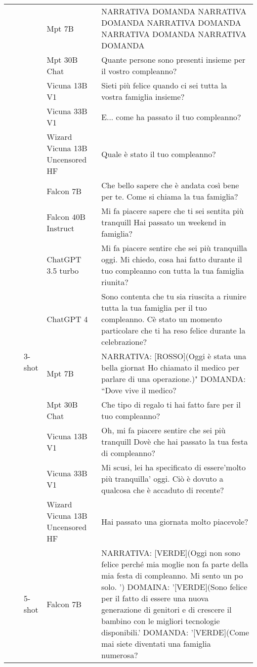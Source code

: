 \begin{center}
\begin{longtable}{l|l|l|p{3cm}|p{8cm}}
 &  &  & Mpt 7B & NARRATIVA DOMANDA NARRATIVA DOMANDA NARRATIVA DOMANDA NARRATIVA DOMANDA NARRATIVA DOMANDA \\
 &  &  & Mpt 30B Chat & Quante persone sono presenti insieme per il vostro compleanno? \\
 &  &  & Vicuna 13B V1 & Sieti più felice quando ci sei tutta la vostra famiglia insieme? \\
 &  &  & Vicuna 33B V1 & E... come ha passato il tuo compleanno? \\
 &  &  & Wizard Vicuna 13B Uncensored HF &  Quale è stato il tuo compleanno? \\
\cline{3-5}
 &  & \multirow[c]{9}{*}{3-shot} & Falcon 7B & Che bello sapere che è andata così bene per te. Come si chiama la tua famiglia? \\
 &  &  & Falcon 40B Instruct & Mi fa piacere sapere che ti sei sentita più tranquill Hai passato un weekend in famiglia? \\
 &  &  & ChatGPT 3.5 turbo & Mi fa piacere sentire che sei più tranquilla oggi. Mi chiedo, cosa hai fatto durante il tuo compleanno con tutta la tua famiglia riunita? \\
 &  &  & ChatGPT 4 & Sono contenta che tu sia riuscita a riunire tutta la tua famiglia per il tuo compleanno. Cè stato un momento particolare che ti ha reso felice durante la celebrazione? \\
 &  &  & Mpt 7B & NARRATIVA: [ROSSO](Oggi è stata una bella giornat Ho chiamato il medico per parlare di una operazione.)" DOMANDA: ``Dove vive il medico? \\
 &  &  & Mpt 30B Chat & Che tipo di regalo ti hai fatto fare per il tuo compleanno? \\
 &  &  & Vicuna 13B V1 & Oh, mi fa piacere sentire che sei più tranquill Dovè che hai passato la tua festa di compleanno? \\
 &  &  & Vicuna 33B V1 &  Mi scusi, lei ha specificato di essere'molto più tranquilla' oggi. Ciò è dovuto a qualcosa che è accaduto di recente? \\
 &  &  & Wizard Vicuna 13B Uncensored HF & Hai passato una giornata molto piacevole? \\
\cline{3-5}
 &  & \multirow[c]{9}{*}{5-shot} & Falcon 7B & NARRATIVA: [VERDE](Oggi non sono felice perché mia moglie non fa parte della mia festa di compleanno. Mi sento un po solo. ') DOMAINA: '[VERDE](Sono felice per il fatto di essere una nuova generazione di genitori e di crescere il bambino con le migliori tecnologie disponibili.' DOMANDA: '[VERDE](Come mai siete diventati una famiglia numerosa? \\

\end{longtable}
\end{center}
